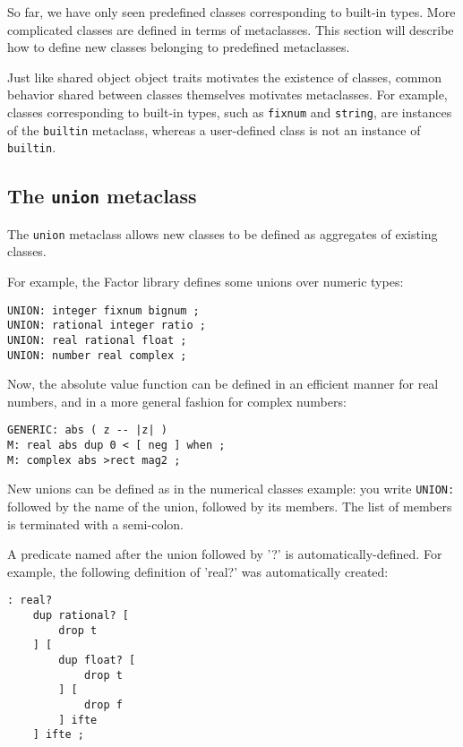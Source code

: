 \documentclass[english]{book}
\begin{document}
So far, we have only seen predefined classes corresponding to built-in
types. More complicated classes are defined in terms of metaclasses.
This section will describe how to define new classes belonging to
predefined metaclasses.

Just like shared object object traits motivates the existence of classes,
common behavior shared between classes themselves motivates metaclasses.
For example, classes corresponding to built-in types, such as \texttt{fixnum}
and \texttt{string}, are instances of
the \texttt{builtin} metaclass, whereas a user-defined class is not an
instance of \texttt{builtin}.

\subsection{The \texttt{union} metaclass}

The \texttt{union} metaclass allows new classes to be
defined as aggregates of existing classes.

For example, the Factor library defines some unions over numeric types:

\begin{verbatim}
UNION: integer fixnum bignum ;
UNION: rational integer ratio ;
UNION: real rational float ;
UNION: number real complex ;
\end{verbatim}

Now, the absolute value function can be defined in an efficient manner
for real numbers, and in a more general fashion for complex numbers:

\begin{verbatim}
GENERIC: abs ( z -- |z| )
M: real abs dup 0 < [ neg ] when ;
M: complex abs >rect mag2 ;
\end{verbatim}

New unions can be defined as in the numerical classes example:
you write \texttt{UNION:} followed by the name of the union,
followed by its members. The list of members is terminated with a
semi-colon.

A predicate named after the union followed by '?' is
automatically-defined. For example, the following definition of 'real?'
was automatically created:

\begin{verbatim}
: real?
    dup rational? [
        drop t 
    ] [
        dup float? [
            drop t 
        ] [
            drop f 
        ] ifte 
    ] ifte ;
\end{verbatim}
\end{document}
